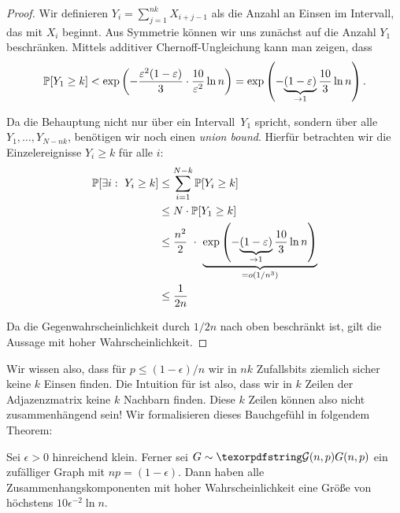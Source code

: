 \begin{proof}
    Wir definieren $Y_i = \sum_{j=1}^{nk} X_{i+j-1}$ als die Anzahl an Einsen im Intervall, das mit $X_i$ beginnt.
    Aus Symmetrie können wir uns zunächst auf die Anzahl $Y_1$ beschränken.
    Mittels additiver Chernoff-Ungleichung kann man zeigen, dass
    \begin{equation}
        \mathbb{P}\!\left[Y_1 \ge k\right] < \exp\left(-\frac{\varepsilon^2(1-\varepsilon)}{3} \cdot \frac{10}{\varepsilon^2} \ln n \right)
        = \exp\left(-\! \underbrace{(1-\varepsilon)}_{\to 1} \frac{10}{3} \ln n \right).
    \end{equation}

    Da die Behauptung nicht nur über ein Intervall~$Y_1$ spricht, sondern über alle $Y_1, \ldots, Y_{N-nk}$, benötigen wir noch einen \emph{union bound}.
    Hierfür betrachten wir die Einzelereignisse $Y_i \ge k$ für alle $i$:
    \begin{align}
        \prob{\exists i:\ Y_i \ge k} & \le \sum_{i=1}^{N-k} \prob{Y_i \ge k}                                                                                          \\
                                     & \le N \cdot \prob{Y_1 \ge k}                                                                                                   \\
                                     & \le \frac{n^2}{2} \ \cdot\ \underbrace{\exp\left(-\! \underbrace{(1-\epsilon)}_{\to 1} \frac{10}{3} \ln n \right)}_{=o(1/n^3)} \\
                                     & \le \frac{1}{2n}
    \end{align}

    Da die Gegenwahrscheinlichkeit durch $1/2n$ nach oben beschränkt ist, gilt die Aussage mit hoher Wahrscheinlichkeit.
\end{proof}

Wir wissen also, dass für $p \le (1 - \epsilon) / n$ wir in $nk$ Zufallsbits ziemlich sicher keine $k$ Einsen finden.
Die Intuition für \Gnp ist also, dass wir in $k$ Zeilen der Adjazenzmatrix keine $k$ Nachbarn finden.
Diese $k$ Zeilen können also nicht zusammenhängend sein!
Wir formalisieren dieses Bauchgefühl in folgendem Theorem:

\begin{theorem}
    Sei  $\epsilon > 0$ hinreichend klein.
    Ferner sei $G \sim \Gnp$ ein zufälliger Graph mit $np = (1 - \epsilon)$.
    Dann haben alle Zusammenhangskomponenten mit hoher Wahrscheinlichkeit eine Größe von höchstens $10 \epsilon^{-2} \ln n$.
\end{theorem}

